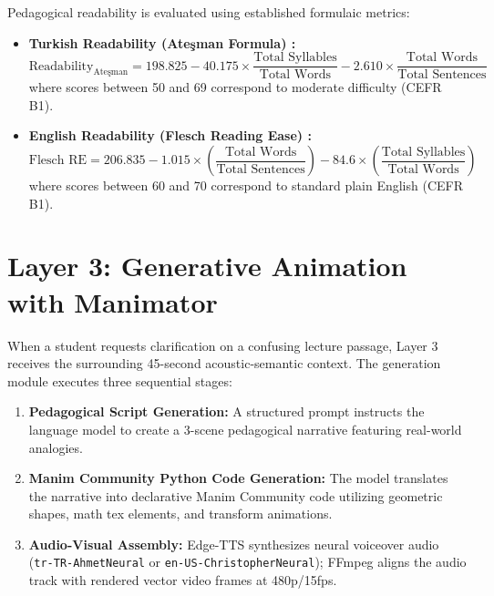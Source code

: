 \documentclass[a4paper,12pt]{report}
\begin{document}
Pedagogical readability is evaluated using established formulaic metrics:
\begin{itemize}
    \item \textbf{Turkish Readability (Ateşman Formula) \cite{atesman1997}:}
    \begin{equation}
    \text{Readability}_{\text{Ateşman}} = 198.825 - 40.175 \times \frac{\text{Total Syllables}}{\text{Total Words}} - 2.610 \times \frac{\text{Total Words}}{\text{Total Sentences}}
    \end{equation}
    where scores between 50 and 69 correspond to moderate difficulty (CEFR B1).
    \item \textbf{English Readability (Flesch Reading Ease) \cite{flesch1948}:}
    \begin{equation}
    \text{Flesch RE} = 206.835 - 1.015 \times \left(\frac{\text{Total Words}}{\text{Total Sentences}}\right) - 84.6 \times \left(\frac{\text{Total Syllables}}{\text{Total Words}}\right)
    \end{equation}
    where scores between 60 and 70 correspond to standard plain English (CEFR B1).
\end{itemize}

\section{Layer 3: Generative Animation with Manimator}
When a student requests clarification on a confusing lecture passage, Layer 3 receives the surrounding 45-second acoustic-semantic context. The generation module executes three sequential stages:
\begin{enumerate}
    \item \textbf{Pedagogical Script Generation:} A structured prompt instructs the language model to create a 3-scene pedagogical narrative featuring real-world analogies.
    \item \textbf{Manim Community Python Code Generation:} The model translates the narrative into declarative Manim Community code utilizing geometric shapes, math tex elements, and transform animations.
    \item \textbf{Audio-Visual Assembly:} Edge-TTS synthesizes neural voiceover audio (\texttt{tr-TR-AhmetNeural} or \texttt{en-US-ChristopherNeural}); FFmpeg aligns the audio track with rendered vector video frames at 480p/15fps.
\end{enumerate}
\end{document}
